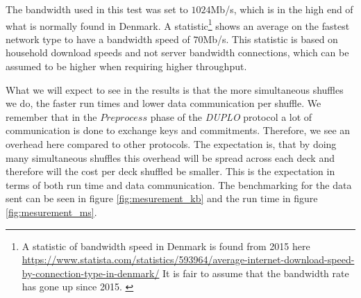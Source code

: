 \documentclass[twoside,11pt,openright]{report}
\newcommand{\DUPLO}{\textit{DUPLO} }
\begin{document}
The bandwidth used in this test was set to $1024$Mb/s, which is in the high end of what is normally found in Denmark. A statistic\footnote{A statistic of bandwidth speed in Denmark is found from 2015 here \linebreak \url{https://www.statista.com/statistics/593964/average-internet-download-speed-by-connection-type-in-denmark/} \linebreak It is fair to assume that the bandwidth rate has gone up since 2015. \label{footnote:bandwith_stats}} shows an average on the fastest network type to have a bandwidth speed of $70$Mb/s. This statistic is based on household download speeds and not server bandwidth connections, which can be assumed to be higher when requiring higher throughput.

\bigskip

What we will expect to see in the results is that the more simultaneous shuffles we do, the faster run times and lower data communication per shuffle. We remember that in the $Preprocess$ phase of the \DUPLO protocol a lot of communication is done to exchange keys and commitments. Therefore, we see an overhead here compared to other protocols. The expectation is, that by doing many simultaneous shuffles this overhead will be spread across each deck and therefore will the cost per deck shuffled be smaller. This is the expectation in terms of both run time and data communication. The benchmarking for the data sent can be seen in figure \ref{fig:mesurement_kb} and the run time in figure \ref{fig:mesurement_ms}.
\end{document}
